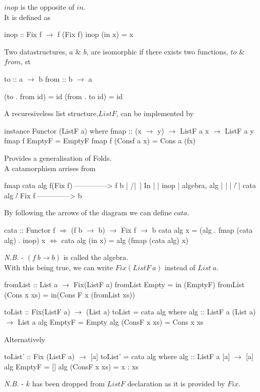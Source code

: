 \documentclass[11pt,a4paper]{article}
\begin{document}

$inop$ is the opposite of $in$.\\
It is defined as
\begin{code}
inop :: Fix f $\to$ f (Fix f)
inop (in x) = x
\end{code}

Two datastructures, $a$ \& $b$, are isomorphic if there exists two functions, $to$ \& $from$, st
\begin{code}
to   :: a $\to$ b
from :: b $\to$ a

(to . from id) = id
(from . to id) = id
\end{code}

A recuresiveless list structure,$ListF$, can be implemented by
\begin{code}
instance Functor (ListF a) where
  fmap :: (x $\to$ y) $\to$ ListF a x $\to$ ListF a y
  fmap f EmptyF      = EmptyF
  fmap f (Consf a x) = Cons a (fx)
\end{code}

Provides a generalisation of Folds.\\
A catamorphism arrises from
\begin{code} %
          fmap cata alg
f(Fix f) --------------> f b
   |  /|\                 |
In |   | inop             | algebra, alg
   |   |                  |
  \|/  |  cata alg       \|/
  Fix f -------------->   b
\end{code}

By following the arrows of the diagram we can define $cata$.
\begin{code}
    cata :: Functor f $\Rightarrow$ (f b $\to$ b) $\to$ Fix f $\to$ b
    cata alg x = (alg . fmap (cata alg) . inop) x
$\Longleftrightarrow$ cata alg (in x) = alg (fmap (cata alg) x)
\end{code}
\textit{N.B.} - $(f\ b \to b)$ is called the algebra.\\

With this being true, we can write $Fix(ListF\ a)$ instead of $List\ a$.
\begin{code}
fromList :: List a $\to$ Fix(ListF a)
fromList Empty       = in (EmptyF)
fromList (Cons x xs) = in(Cons F x (fromList xs))

toList :: Fix(ListF a) $\to$ (List a)
toList = cata alg
  where
    alg :: ListF a (List a) $\to$ List a
    alg EmptyF       = Empty
    alg (ConsF x xs) = Cons x xs
\end{code}
Alternatively
\begin{code}
toList' :: Fix (ListF a) $\to$ [a]
toList' = cata alg
  where
    alg :: ListF a [a] $\to$ [a]
    alg EmptyF       = []
    alg (ConsF x xs) = x : xs
\end{code}
\textit{N.B.} - $k$ has been dropped from $ListF$ declaration as it is provided by $Fix$.\\
\end{document}
